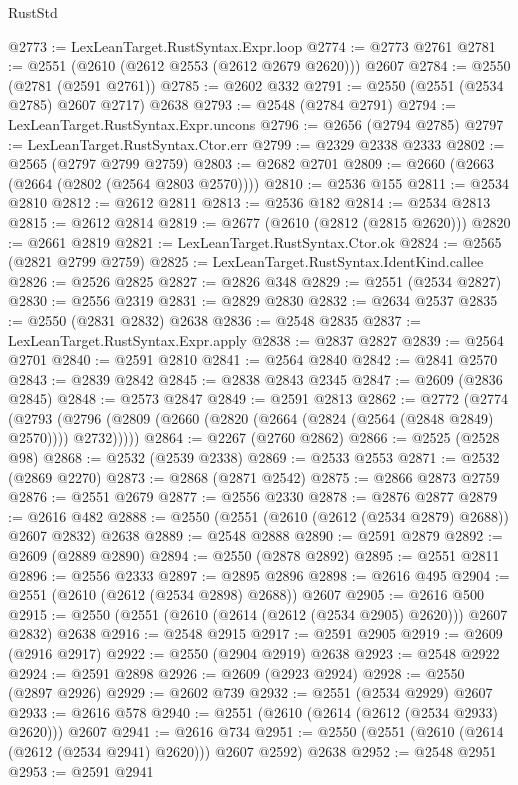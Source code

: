 \begin{lexlean}{RustStd}
\begin{coremodule}
@2773 := LexLeanTarget.RustSyntax.Expr.loop
@2774 := @2773 @2761
@2781 := @2551 (@2610 (@2612 @2553 (@2612 @2679 @2620))) @2607
@2784 := @2550 (@2781 (@2591 @2761))
@2785 := @2602 @332
@2791 := @2550 (@2551 (@2534 @2785) @2607 @2717) @2638
@2793 := @2548 (@2784 @2791)
@2794 := LexLeanTarget.RustSyntax.Expr.uncons
@2796 := @2656 (@2794 @2785)
@2797 := LexLeanTarget.RustSyntax.Ctor.err
@2799 := @2329 @2338 @2333
@2802 := @2565 (@2797 @2799 @2759)
@2803 := @2682 @2701
@2809 := @2660 (@2663 (@2664 (@2802 (@2564 @2803 @2570))))
@2810 := @2536 @155
@2811 := @2534 @2810
@2812 := @2612 @2811
@2813 := @2536 @182
@2814 := @2534 @2813
@2815 := @2612 @2814
@2819 := @2677 (@2610 (@2812 (@2815 @2620)))
@2820 := @2661 @2819
@2821 := LexLeanTarget.RustSyntax.Ctor.ok
@2824 := @2565 (@2821 @2799 @2759)
@2825 := LexLeanTarget.RustSyntax.IdentKind.callee
@2826 := @2526 @2825
@2827 := @2826 @348
@2829 := @2551 (@2534 @2827)
@2830 := @2556 @2319
@2831 := @2829 @2830
@2832 := @2634 @2537
@2835 := @2550 (@2831 @2832) @2638
@2836 := @2548 @2835
@2837 := LexLeanTarget.RustSyntax.Expr.apply
@2838 := @2837 @2827
@2839 := @2564 @2701
@2840 := @2591 @2810
@2841 := @2564 @2840
@2842 := @2841 @2570
@2843 := @2839 @2842
@2845 := @2838 @2843 @2345
@2847 := @2609 (@2836 @2845)
@2848 := @2573 @2847
@2849 := @2591 @2813
@2862 := @2772
    (@2774
      (@2793 (@2796 (@2809 (@2660 (@2820 (@2664 (@2824 (@2564 (@2848 @2849) @2570)))) @2732)))))
@2864 := @2267 (@2760 @2862)
@2866 := @2525 (@2528 @98)
@2868 := @2532 (@2539 @2338)
@2869 := @2533 @2553
@2871 := @2532 (@2869 @2270)
@2873 := @2868 (@2871 @2542)
@2875 := @2866 @2873 @2759
@2876 := @2551 @2679
@2877 := @2556 @2330
@2878 := @2876 @2877
@2879 := @2616 @482
@2888 := @2550 (@2551 (@2610 (@2612 (@2534 @2879) @2688)) @2607 @2832) @2638
@2889 := @2548 @2888
@2890 := @2591 @2879
@2892 := @2609 (@2889 @2890)
@2894 := @2550 (@2878 @2892)
@2895 := @2551 @2811
@2896 := @2556 @2333
@2897 := @2895 @2896
@2898 := @2616 @495
@2904 := @2551 (@2610 (@2612 (@2534 @2898) @2688)) @2607
@2905 := @2616 @500
@2915 := @2550 (@2551 (@2610 (@2614 (@2612 (@2534 @2905) @2620))) @2607 @2832) @2638
@2916 := @2548 @2915
@2917 := @2591 @2905
@2919 := @2609 (@2916 @2917)
@2922 := @2550 (@2904 @2919) @2638
@2923 := @2548 @2922
@2924 := @2591 @2898
@2926 := @2609 (@2923 @2924)
@2928 := @2550 (@2897 @2926)
@2929 := @2602 @739
@2932 := @2551 (@2534 @2929) @2607
@2933 := @2616 @578
@2940 := @2551 (@2610 (@2614 (@2612 (@2534 @2933) @2620))) @2607
@2941 := @2616 @734
@2951 := @2550 (@2551 (@2610 (@2614 (@2612 (@2534 @2941) @2620))) @2607 @2592) @2638
@2952 := @2548 @2951
@2953 := @2591 @2941

\end{coremodule}
\end{lexlean}
